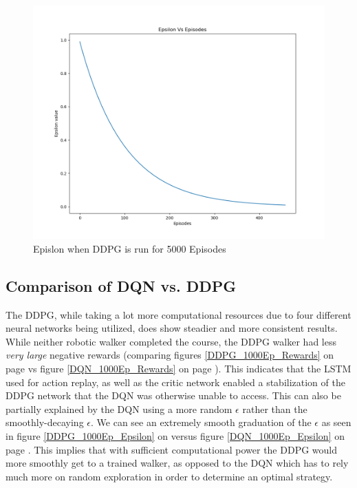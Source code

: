 \documentclass[doc, onecolumn, 12pt]{apa6}
\begin{document}
\begin{figure}
\label{DQN_5000Ep_Epsilon}
\includegraphics[width =\textwidth, height=0.4 \textheight]{results/ddpg/5000_ep/Epsilon.png}
\caption{Epislon when DDPG is run for 5000 Episodes}
\end{figure}
\FloatBarrier
\subsection{Comparison of DQN vs. DDPG}
The DDPG, while taking a lot more computational resources due to four different neural networks being utilized, does show steadier and more consistent results. While neither robotic walker completed the course, the DDPG walker had less \emph{very large} negative rewards (comparing figures \ref{DDPG_1000Ep_Rewards}  on page \pageref{DDPG_1000Ep_Rewards} vs figure \ref{DQN_1000Ep_Rewards} on page \pageref{DQN_1000Ep_Rewards}). This indicates that the LSTM used for action replay, as well as the critic network enabled a stabilization of the DDPG network that the DQN was otherwise unable to access. This can also be partially explained by the DQN using a more random $\epsilon$ rather than the smoothly-decaying $\epsilon$. We can see an extremely smooth graduation of the $\epsilon$ as seen in figure \ref{DDPG_1000Ep_Epsilon} on \pageref{DDPG_1000Ep_Epsilon} versus figure \ref{DQN_1000Ep_Epsilon} on page \pageref{DQN_1000Ep_Epsilon}. This implies that with sufficient computational power the DDPG would more smoothly get to a trained walker, as opposed to the DQN which has to rely much more on random exploration in order to determine an optimal strategy. 
\end{document}
